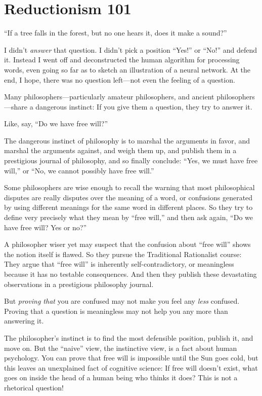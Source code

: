 \myendsectiontext


\bigskip

\chapter{Reductionism 101}


{
 ``If a tree falls in the forest, but no one hears
it, does it make a sound?'' }

{
 I didn't \textit{answer} that question. I
didn't pick a position
``Yes!'' or
``No!'' and defend it. Instead I
went off and deconstructed the human algorithm for processing words,
even going so far as to sketch an illustration of a neural network. At
the end, I hope, there was no question left---not even the feeling of a
question.}

{
 Many philosophers---particularly amateur philosophers, and ancient
philosophers---share a dangerous instinct: If you give them a question,
they try to answer it.}

{
 Like, say, ``Do we have free
will?''}

{
 The dangerous instinct of philosophy is to marshal the arguments
in favor, and marshal the arguments against, and weigh them up, and
publish them in a prestigious journal of philosophy, and so finally
conclude: ``Yes, we must have free
will,'' or ``No, we cannot possibly
have free will.''}

{
 Some philosophers are wise enough to recall the warning that most
philosophical disputes are really disputes over the meaning of a word,
or confusions generated by using different meanings for the same word
in different places. So they try to define very precisely what they
mean by ``free will,'' and then ask
again, ``Do we have free will? Yes or
no?''}

{
 A philosopher wiser yet may suspect that the confusion about
``free will'' shows the notion
itself is flawed. So they pursue the Traditional Rationalist course:
They argue that ``free will'' is
inherently self-contradictory, or meaningless because it has no
testable consequences. And then they publish these devastating
observations in a prestigious philosophy journal.}

{
 But \textit{proving that} you are confused may not make you feel
any \textit{less} confused. Proving that a question is meaningless may
not help you any more than answering it.}

{
 The philosopher's instinct is to find the most
defensible position, publish it, and move on. But the
``naive'' view, the instinctive
view, is a fact about human psychology. You can prove that free will is
impossible until the Sun goes cold, but this leaves an unexplained fact
of cognitive science: If free will doesn't exist, what
goes on inside the head of a human being who thinks it does? This is
not a rhetorical question!}

